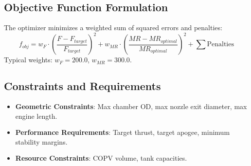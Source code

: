 \subsection{Objective Function Formulation}
The optimizer minimizes a weighted sum of squared errors and penalties:
\begin{equation}
f_{obj} = w_F \cdot \left(\frac{F - F_{target}}{F_{target}}\right)^2 + w_{MR} \cdot \left(\frac{MR - MR_{optimal}}{MR_{optimal}}\right)^2 + \sum \text{Penalties}
\end{equation}
Typical weights: $w_F = 200.0$, $w_{MR} = 300.0$.

\subsection{Constraints and Requirements}
\begin{itemize}
    \item \textbf{Geometric Constraints}: Max chamber OD, max nozzle exit diameter, max engine length.
    \item \textbf{Performance Requirements}: Target thrust, target apogee, minimum stability margins.
    \item \textbf{Resource Constraints}: COPV volume, tank capacities.
\end{itemize}
